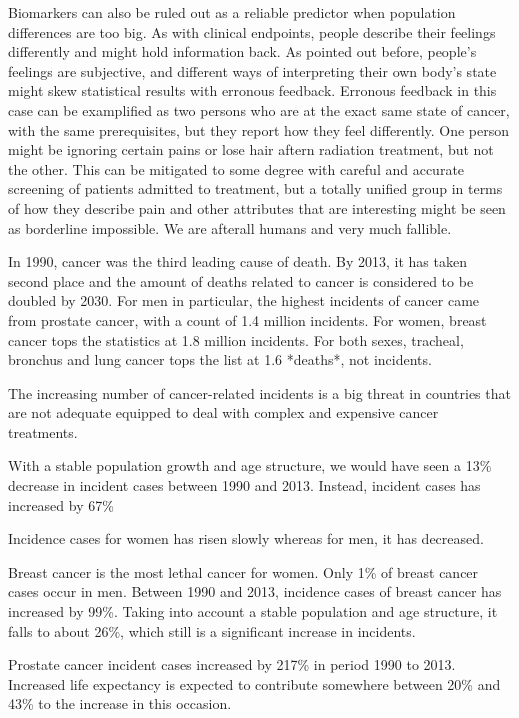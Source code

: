 \documentclass[UKenglish]{ifimaster}
\begin{document}
Biomarkers can also be ruled out as a reliable predictor when population
differences are too big. As with clinical endpoints, people describe their
feelings differently and might hold information back. As pointed out before,
people's feelings are subjective, and different ways of interpreting their own
body's state might skew statistical results with erronous feedback. Erronous
feedback in this case can be examplified as two persons who are at the exact
same state of cancer, with the same prerequisites, but they report how they feel
differently. One person might be ignoring certain pains or lose hair aftern
radiation treatment, but not the other. This can be mitigated to some degree
with careful and accurate screening of patients admitted to treatment, but a
totally unified group in terms of how they describe pain and other attributes
that are interesting might be seen as borderline impossible. We are afterall
humans and very much fallible.

In 1990, cancer was the third leading cause of death. By 2013, it has taken
second place and the amount of deaths related to cancer is considered to be
doubled by 2030. For men in particular, the highest incidents of cancer came
from prostate cancer, with a count of 1.4 million incidents. For women, breast
cancer tops the statistics at 1.8 million incidents. For both sexes, tracheal,
bronchus and lung cancer tops the list at 1.6 *deaths*, not incidents.

The increasing number of cancer-related incidents is a big threat in countries
that are not adequate equipped to deal with complex and expensive cancer
treatments.

With a stable population growth and age structure, we would have seen a 13\%
decrease in incident cases between 1990 and 2013. Instead, incident cases has
increased by 67\%

Incidence cases for women has risen slowly whereas for men, it has decreased.

Breast cancer is the most lethal cancer for women. Only 1\% of breast cancer
cases occur in men. Between 1990 and 2013, incidence cases of breast cancer has
increased by 99\%. Taking into account a stable population and age structure, it
falls to about 26\%, which still is a significant increase in incidents.

Prostate cancer incident cases increased by 217\% in period 1990 to 2013.
Increased life expectancy is expected to contribute somewhere between 20\% and
43\% to the increase in this occasion.
\end{document}
